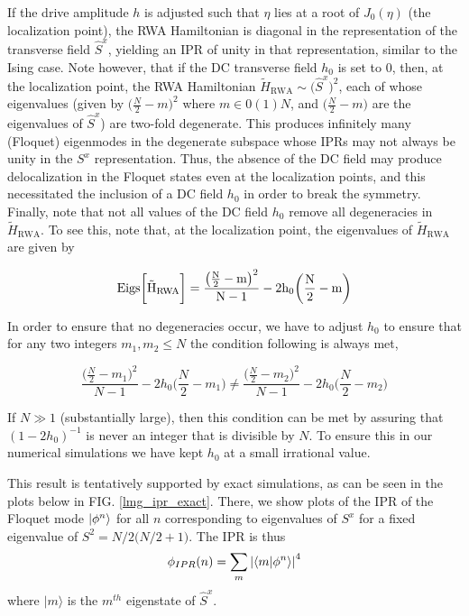 \documentclass[%
reprint,
superscriptaddress,
amsmath,amssymb,
aps,
prb,
]{revtex4-2}
\begin{document}
	
	If the drive amplitude $h$ is adjusted such that $\eta$ lies at a root of $J_0(\eta)$ (the localization point), the RWA Hamiltonian is diagonal in the representation of the transverse field $\hat{S}^x$, yielding an IPR of unity in that representation, similar to the Ising case. Note however, that if the DC transverse field $h_0$ is set to $0$, then, at the localization point, the RWA Hamiltonian $\tilde{H}_{\mathrm{RWA}}\sim
	\big(\hat{S}^x\big)^2$, each of whose eigenvalues (given by $\big(\frac{N}{2}-m\big)^2$ where $m \in 0(1)N$, and $\big(\frac{N}{2}-m\big)$  are the eigenvalues of $\hat{S}^x$) are two-fold degenerate. This produces infinitely many (Floquet) eigenmodes in the degenerate subspace whose IPRs may not always be unity in the $S^x$ representation. Thus, the absence of the DC field may produce delocalization in the Floquet states even at the localization points, and this necessitated the inclusion of a DC field $h_0$ in order to break the symmetry.
	Finally, note that not all values of the DC field $h_0$ remove all degeneracies in $\tilde{H}_{\mathrm{RWA}}$. To see this, note that, at the localization point, the eigenvalues of $\tilde{H}_{\mathrm{RWA}}$ are given by
	
	\begin{equation}
	\rm{Eigs}\bigg[\tilde{H}_{\mathrm{RWA}}\bigg] = \frac{\big(\frac{N}{2}-m\big)^2}{N-1} - 2h_0 \bigg(\frac{N}{2}-m\bigg)
	\end{equation}
	
	In order to ensure that no degeneracies occur, we have to adjust $h_0$ to ensure that for any two integers $m_1, m_2 \leq N$  the condition following is always met,
	
	\begin{equation}
	\frac{\big(\frac{N}{2}-m_1\big)^2}{N-1} - 2h_0 \bigg(\frac{N}{2}-m_1\bigg) \neq \frac{\big(\frac{N}{2}-m_2\big)^2}{N-1} - 2h_0 \bigg(\frac{N}{2}-m_2\bigg)
	\end{equation}
	
	If $N\gg 1$ (substantially large), then this condition can be met by assuring that $(1-2h_0)^{-1}$ is never an integer that is divisible by $N$. To ensure this in our numerical simulations we have kept $h_0$ at a small irrational value.
	
	
	This result is tentatively supported by exact simulations, as can be seen in the plots below in FIG. \ref{lmg_ipr_exact}. There, we show plots of the IPR of the Floquet mode $\ket{\phi^n}$ for all $n$ corresponding to eigenvalues of $S^x$ for a fixed eigenvalue of $S^2 = N/2\big(N/2 + 1\big)$. The IPR is thus
	\begin{equation}
	\phi_{IPR}(n) = \sum_m \abs{\ip{m}{\phi^n}}^4
	\label{iprlmg}
	\end{equation}
	where $|m\rangle$ is the $m^{th}$ eigenstate of $\hat{S}^x$.
	
\end{document}
